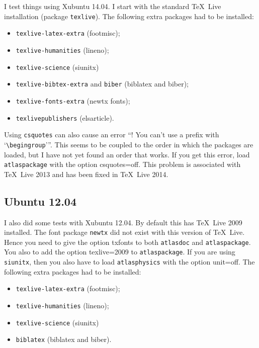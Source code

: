 \documentclass[atlasstyle,UKenglish]{latex/atlasdoc}
\newcommand{\Macro}[1]{\texttt{\textbackslash #1}\xspace}
\newcommand{\Option}[1]{\textsf{#1}\xspace}
\newcommand{\Package}[1]{\texttt{#1}\xspace}
\begin{document}
I test things using Xubuntu 14.04.
I start with the standard \TeX\ Live installation (package \texttt{texlive}).
The following extra packages had to be installed:
\begin{itemize}\setlength{\parskip}{0pt}\setlength{\itemsep}{0pt}
\item \Package{texlive-latex-extra} (footmisc);
\item \Package{texlive-humanities} (lineno);
\item \Package{texlive-science} (siunitx)
\item \Package{texlive-bibtex-extra} and \Package{biber} (biblatex and biber);
\item \Package{texlive-fonts-extra} (newtx fonts);
\item \Package{texlivepublishers} (elsarticle).
\end{itemize}
Using \Package{csquotes} can also cause an error
\enquote{! You can't use a prefix with \enquote{\Macro{begingroup}}}.
This seems to be coupled to the order in which the packages are loaded, 
but I have not yet found an order that works.
If you get this error, load \Package{atlaspackage} with the option \Option{csquotes=off}.
This problem is associated with \TeX\ Live 2013 and has been fixed in \TeX\ Live 2014.


\subsection{Ubuntu 12.04}

I also did some tests with Xubuntu 12.04.
By default this has \TeX\ Live 2009 installed.
The font package \Package{newtx} did not exist with this version of \TeX\ Live.
Hence you need to give the option \Option{txfonts} to both \Package{atlasdoc} and \Package{atlaspackage}.
You also to add the option \Option{texlive=2009} to \Package{atlaspackage}.
If you are using \Package{siunitx}, then you also have to load \Package{atlasphysics}
with the option \Option{unit=off}.
The following extra packages had to be installed:
\begin{itemize}\setlength{\parskip}{0pt}\setlength{\itemsep}{0pt}
\item \Package{texlive-latex-extra} (footmisc);
\item \Package{texlive-humanities} (lineno);
\item \Package{texlive-science} (siunitx)
\item \Package{biblatex} (biblatex and biber).
\end{itemize}
\end{document}
